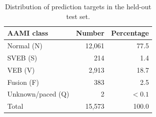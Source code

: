 \begin{table}[t]
  \centering
  \caption{Distribution of prediction targets in the held-out test set.}
  \label{tab:cohort-distribution}
  \begin{tabular}{lrr}
    \toprule
    AAMI class & Number & Percentage \\
    \midrule
    Normal (N) & 12{,}061 & 77.5 \\
    SVEB (S) & 214 & 1.4 \\
    VEB (V) & 2{,}913 & 18.7 \\
    Fusion (F) & 383 & 2.5 \\
    Unknown/paced (Q) & 2 & $<0.1$ \\
    \midrule
    Total & 15{,}573 & 100.0 \\
    \bottomrule
  \end{tabular}
\end{table}

